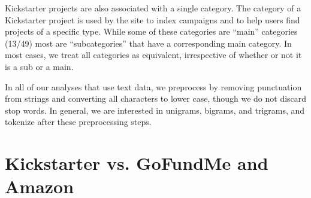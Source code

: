 \documentclass[letterpaper]{article}
\begin{document}
Kickstarter projects are also associated with a single category. The category of a Kickstarter project is used by the site to index campaigns and to help users find projects of a specific type. While some of these categories are ``main'' categories (13/49) most are ``subcategories'' that have a corresponding main category. In most cases, we treat all categories as equivalent, irrespective of whether or not it is a sub or a main.

In all of our analyses that use text data, we preprocess by removing punctuation from strings and converting all characters to lower case, though we do not discard stop words. In general, we are interested in unigrams, bigrams, and trigrams, and tokenize after these preprocessing steps.

\section{Kickstarter vs. GoFundMe and Amazon}
\end{document}
